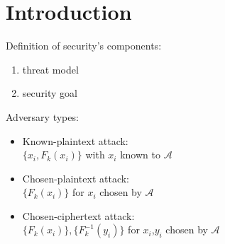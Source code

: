 \section{Introduction}
Definition of security's components:
\begin{enumerate}
    \item threat model
    \item security goal
\end{enumerate}

Adversary types:
\begin{itemize}
    \item Known-plaintext attack:\\
    $\{x_i,F_k(x_i)\}$ with $x_i$ known to $\mathcal{A}$
    \item Chosen-plaintext attack:\\
    $\{F_k(x_i)\}$ for $x_i$ chosen by $\mathcal{A}$
    \item Chosen-ciphertext attack:\\
    $\{F_k(x_i)\},\{F_k^{-1}(y_i)\}$ for $x_i$,$y_i$ chosen by $\mathcal{A}$
\end{itemize}